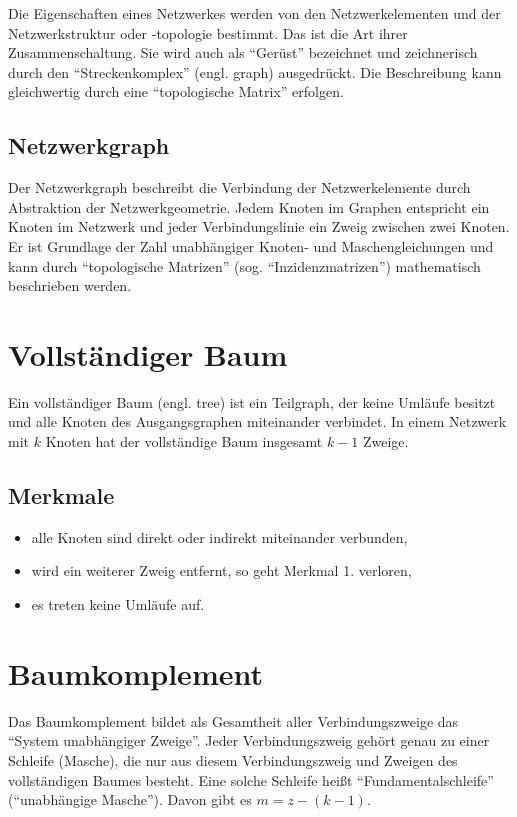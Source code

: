 \documentclass[
  ngerman,
  letterpaper,
]{scrbook}
\begin{document}
Die Eigenschaften eines Netzwerkes werden von den Netzwerkelementen und
der Netzwerkstruktur oder -topologie bestimmt. Das ist die Art ihrer
Zusammenschaltung. Sie wird auch als ``Gerüst'' bezeichnet und
zeichnerisch durch den ``Streckenkomplex'' (engl. graph) ausgedrückt.
Die Beschreibung kann gleichwertig durch eine ``topologische Matrix''
erfolgen.

\subsection{Netzwerkgraph}\label{netzwerkgraph}

Der Netzwerkgraph beschreibt die Verbindung der Netzwerkelemente durch
Abstraktion der Netzwerkgeometrie. Jedem Knoten im Graphen entspricht
ein Knoten im Netzwerk und jeder Verbindungslinie ein Zweig zwischen
zwei Knoten. Er ist Grundlage der Zahl unabhängiger Knoten- und
Maschengleichungen und kann durch ``topologische Matrizen'' (sog.
``Inzidenzmatrizen'') mathematisch beschrieben werden.

\section{Vollständiger Baum}\label{vollstuxe4ndiger-baum}

Ein vollständiger Baum (engl. tree) ist ein Teilgraph, der keine Umläufe
besitzt und alle Knoten des Ausgangsgraphen miteinander verbindet. In
einem Netzwerk mit \(k\) Knoten hat der vollständige Baum insgesamt
\(k-1\) Zweige.

\subsection{Merkmale}\label{merkmale}

\begin{itemize}
\item
  alle Knoten sind direkt oder indirekt miteinander verbunden,
\item
  wird ein weiterer Zweig entfernt, so geht Merkmal 1. verloren,
\item
  es treten keine Umläufe auf.
\end{itemize}

\section{Baumkomplement}\label{baumkomplement}

Das Baumkomplement bildet als Gesamtheit aller Verbindungszweige das
``System unabhängiger Zweige''. Jeder Verbindungszweig gehört genau zu
einer Schleife (Masche), die nur aus diesem Verbindungszweig und Zweigen
des vollständigen Baumes besteht. Eine solche Schleife heißt
``Fundamentalschleife'' (``unabhängige Masche''). Davon gibt es
\(m=z-(k-1)\).
\end{document}
